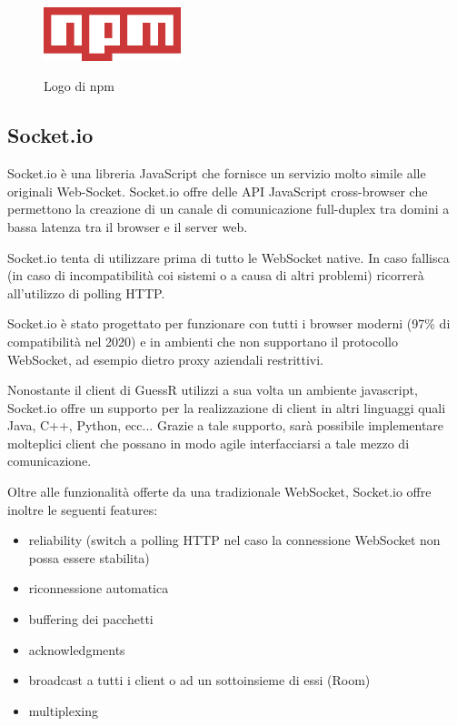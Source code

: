 \begin{figure}[H]
    \caption{Logo di npm ~\cite{npm:online}}
    \centering
    \includegraphics[width=40mm]{img/logos/npm_logo.png}
    \label{fig:npm_logo}
\end{figure}

\subsection{Socket.io}
\noindent Socket.io è una libreria JavaScript che fornisce un servizio molto simile alle originali Web-Socket. Socket.io offre delle API JavaScript cross-browser che permettono la creazione di un canale di comunicazione full-duplex tra domini a bassa latenza tra il browser e il server web. \newline

\noindent Socket.io tenta di utilizzare prima di tutto le WebSocket native. In caso fallisca (in caso di incompatibilità coi sistemi o a causa di altri problemi)
ricorrerà all'utilizzo di polling HTTP. \newline

\noindent Socket.io è stato progettato per funzionare con tutti i browser moderni (97\% di compatibilità nel 2020) e in ambienti che non
supportano il protocollo WebSocket, ad esempio dietro proxy aziendali restrittivi. \newline

\noindent Nonostante il client di GuessR utilizzi a sua volta un ambiente javascript, Socket.io offre un supporto per la realizzazione di client in altri linguaggi quali Java, C++, Python, ecc...\newline
Grazie a tale supporto, sarà possibile implementare molteplici client che possano in modo agile interfacciarsi a tale mezzo di comunicazione.\newline


\noindent Oltre alle funzionalità offerte da una tradizionale WebSocket, Socket.io offre inoltre le seguenti features:
\begin{itemize}
    \item reliability (switch a polling HTTP nel caso la connessione WebSocket non possa essere stabilita)
    \item riconnessione automatica
    \item buffering dei pacchetti
    \item acknowledgments
    \item broadcast a tutti i client o ad un sottoinsieme di essi (Room)
    \item multiplexing
\end{itemize}

